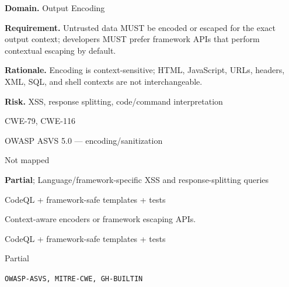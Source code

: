 \documentclass[10pt,letterpaper]{article}
\newcommand{\prioritybadge}[2]{\tcbox[on line,boxrule=0pt,arc=1.2mm,boxsep=0.7mm,left=1mm,right=1mm,top=0.4mm,bottom=0.4mm,colback=#2!12,coltext=#2]{\scriptsize\bfseries #1}}
\begin{document}
\begin{rulebox}[title={\texttt{SCS-ALL-OUTPUT-001} \hfill \prioritybadge{High Priority}{High}}]
\textbf{Domain.} Output Encoding

\textbf{Requirement.} Untrusted data MUST be encoded or escaped for the exact output context; developers MUST prefer framework APIs that perform contextual escaping by default.

\textbf{Rationale.} Encoding is context-sensitive; HTML, JavaScript, URLs, headers, XML, SQL, and shell contexts are not interchangeable.

\textbf{Risk.} XSS, response splitting, code/command interpretation

\begin{description}[leftmargin=2.65cm,labelwidth=2.3cm,style=nextline,itemsep=1pt,topsep=3pt]
  \item[CWE] CWE-79, CWE-116
  \item[OWASP] OWASP ASVS 5.0 --- encoding/sanitization
  \item[CERT] Not mapped
  \item[CodeQL] \textbf{Partial}; Language/framework-specific XSS and response-splitting queries
  \item[Enforcement] CodeQL + framework-safe templates + tests
  \item[Prevention] Context-aware encoders or framework escaping APIs.
  \item[Verification] CodeQL + framework-safe templates + tests
  \item[Automation] Partial
  \item[Sources] \texttt{OWASP-ASVS, MITRE-CWE, GH-BUILTIN}
\end{description}
\end{rulebox}
\end{document}
